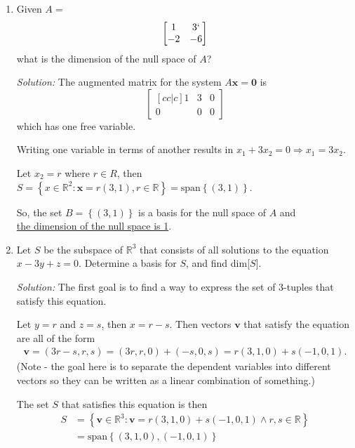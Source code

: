 \documentclass[a4paper,10pt]{report}
\begin{document}
\begin{enumerate}
  \item
    Given $A=$
    \[\begin{bmatrix}
      1 	& 3 `	\\
      -2 	& -6
    \end{bmatrix}\]
    what is the dimension of the null space of $A$?

    \hrulefill

    \textit{Solution:}
      The augmented matrix for the system $A\mathbf{x} = \mathbf{0}$ is
      \[\begin{bmatrix}[cc|c]
      1 & 3 & 0	\\
      0 & 0 & 0
      \end{bmatrix}\]
      which has one free variable.

      Writing one variable in terms of another results in $x_1 + 3x_2 = 0 \Rightarrow x_1 = 3x_2$.

      Let $x_2 = r$ where $r \in R$, then $S = \left\{ x \in \mathbb{R}^2 : \mathbf{x} = r(3,1), r \in \mathbb{R}\right\} = \text{span}\left\{(3,1)\right\}$.

      So, the set $B = \left\{(3,1)\right\}$ is a basis for the null space of $A$ and\\ \underline{the dimension of the null space is 1}.

      \hrulefill

  \item
    Let $S$ be the subspace of $\mathbb{R}^3$ that consists of all solutions to the equation $x-3y+z = 0$. Determine a basis for $S$, and find dim[$S$].

    \hrulefill

    \textit{Solution:}
      The first goal is to find a way to express the set of 3-tuples that satisfy this equation.

      Let $y=r$ and $z=s$, then $x=r-s$. Then vectors $\mathbf{v}$ that satisfy the equation are all of the form
    \begin{align*}
      \mathbf{v} = (3r-s, r, s) = (3r,r,0)+(-s,0,s) = r(3,1,0) + s(-1,0,1).
    \end{align*}
    (Note - the goal here is to separate the dependent variables into different vectors so they can be written as a linear combination of something.)

    The set $S$ that satisfies this equation is then
    \begin{align*}
      S &= \left\{ \mathbf{v} \in \mathbb{R}^3 : \mathbf{v} =r(3,1,0) + s(-1,0,1) \land r,s\in\mathbb{R} \right\} \\
      &= \text{span}\left\{ (3,1,0), (-1,0,1)\right\}
    \end{align*}


\end{enumerate}
\end{document}
